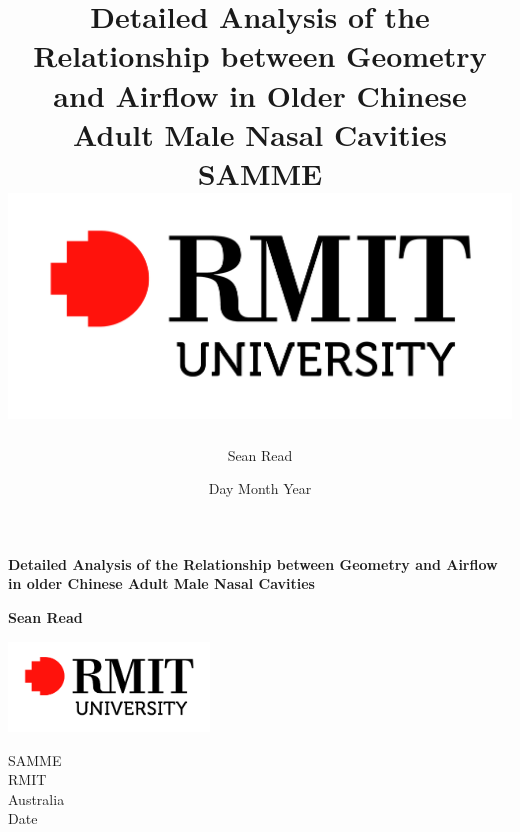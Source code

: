 \documentclass[12pt]{report}
\begin{document}
\title{
	{Detailed Analysis of the Relationship between Geometry and Airflow in Older Chinese Adult Male Nasal Cavities}\\
	{\large SAMME}\\
	{\includegraphics{rmit.jpg}}
}
\author{Sean Read}
\date{Day Month Year}
\begin{titlepage}
    \begin{center}
        \vspace*{1cm}
        
        \Huge
	\textbf{Detailed Analysis of the Relationship between Geometry and Airflow in older Chinese Adult Male Nasal Cavities}
        
        \vspace{1.5cm}
        
        \textbf{Sean Read}
        
        \vfill
        
        \vspace{0.8cm}
        
        \includegraphics[width=0.4\textwidth]{rmit}
        
        \Large
        SAMME\\
        RMIT\\
        Australia\\
        Date
        
    \end{center}
\end{titlepage}
\onehalfspacing
\end{document}
